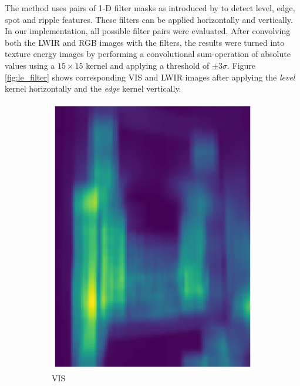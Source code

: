 \documentclass{l4proj}
\begin{document}
The method uses pairs of 1-D filter masks as introduced by \citet{laws_rapid_1980} to detect level, edge, spot and ripple features. These filters can be applied horizontally and vertically. In our implementation, all possible filter pairs were evaluated. After convolving both the LWIR and RGB images with the filters, the results were turned into texture energy images by performing a convolutional sum-operation of absolute values using a $15 \times 15$ kernel and applying a threshold of $\pm 3 \sigma$. Figure \ref{fig:le_filter} shows corresponding VIS and LWIR images after applying the \textit{level} kernel horizontally and the \textit{edge} kernel vertically.

\begin{figure}[ht]
  \centering
  \begin{subfigure}[h!]{0.25\textwidth}
    \includegraphics[width=\textwidth]{images/registration/filtered_le_rgb.png}
    \caption{VIS}
  \end{subfigure}
  \begin{subfigure}[h!]{0.25\textwidth}

\end{subfigure}
\end{figure}
\end{document}
